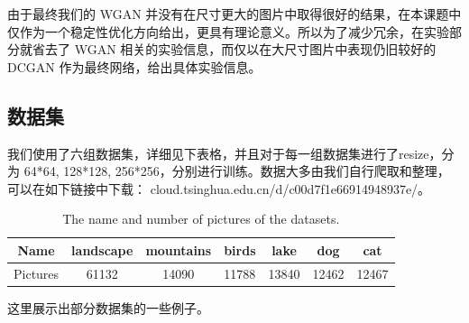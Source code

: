 \documentclass{article}
\begin{document}
\begin{CJK*}{UTF8}{gbsn}
  由于最终我们的 WGAN 并没有在尺寸更大的图片中取得很好的结果，在本课题中仅作为一个稳定性优化方向给出，更具有理论意义。所以为了减少冗余，在实验部分就省去了 WGAN 相关的实验信息，而仅以在大尺寸图片中表现仍旧较好的 DCGAN 作为最终网络，给出具体实验信息。

  \subsection{数据集}
	我们使用了六组数据集，详细见下表格，并且对于每一组数据集进行了resize，分为 64*64, 128*128, 256*256，分别进行训练。数据大多由我们自行爬取和整理，可以在如下链接中下载： cloud.tsinghua.edu.cn/d/c00d7f1e66914948937e/。
	
	\begin{table}[htbp]
		\begin{center}
			\begin{tabular}{|c|c|c|c|c|c|c|}
				\hline
				Name	  & landscape	& mountains	& birds & lake  & dog   & cat \\
				\hline
				Pictures  &	61132		& 14090     & 11788 & 13840 & 12462 & 12467   \\
				\hline
			\end{tabular}
			\vspace{10pt}
			\caption{The name and number of pictures of the datasets.}
		\end{center}
	\end{table}

	这里展示出部分数据集的一些例子。
	

\end{CJK*}
\end{document}
